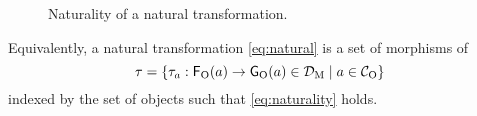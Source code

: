 \begin{definition}
\begin{figure}[htbp]
\begin{center}
    \end{center}
    \caption{Naturality of a natural transformation.}
    \label{fig:naturality}
  \end{figure}

  Equivalently, a natural transformation \eqref{eq:natural} is a set
  of morphisms of 
  \begin{equation}
    \tau = \{\tau_{a}: \mathsf{F}_{\operatorname{O}}(a) \to \mathsf{G}_{\operatorname{O}}(a) \in
    \mathcal{D}_{\operatorname{M}} \mid a \in \mathcal{C}_{\operatorname{O}}\}
  \end{equation}
  indexed by the set of objects  such that
  \eqref{eq:naturality} holds.
\end{definition}

